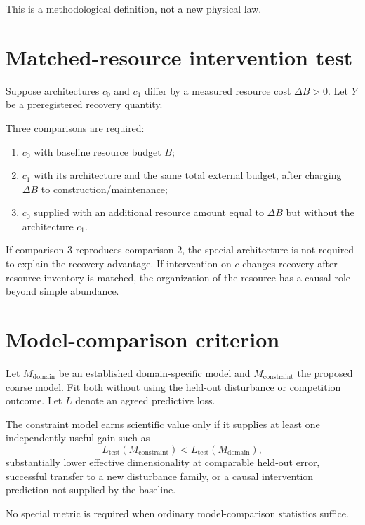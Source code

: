 \documentclass[11pt]{article}
\begin{document}
This is a methodological definition, not a new physical law.

\section{Matched-resource intervention test}

Suppose architectures $c_0$ and $c_1$ differ by a measured resource cost $\Delta B>0$. Let $Y$ be a preregistered recovery quantity.

Three comparisons are required:

\begin{enumerate}
\item $c_0$ with baseline resource budget $B$;
\item $c_1$ with its architecture and the same total external budget, after charging $\Delta B$ to construction/maintenance;
\item $c_0$ supplied with an additional resource amount equal to $\Delta B$ but without the architecture $c_1$.
\end{enumerate}

If comparison 3 reproduces comparison 2, the special architecture is not required to explain the recovery advantage. If intervention on $c$ changes recovery after resource inventory is matched, the organization of the resource has a causal role beyond simple abundance.

\section{Model-comparison criterion}

Let $M_{\mathrm{domain}}$ be an established domain-specific model and $M_{\mathrm{constraint}}$ the proposed coarse model. Fit both without using the held-out disturbance or competition outcome. Let $L$ denote an agreed predictive loss.

The constraint model earns scientific value only if it supplies at least one independently useful gain such as
\begin{equation}
L_{\mathrm{test}}(M_{\mathrm{constraint}})<L_{\mathrm{test}}(M_{\mathrm{domain}}),
\end{equation}
substantially lower effective dimensionality at comparable held-out error, successful transfer to a new disturbance family, or a causal intervention prediction not supplied by the baseline.

No special metric is required when ordinary model-comparison statistics suffice.
\end{document}
